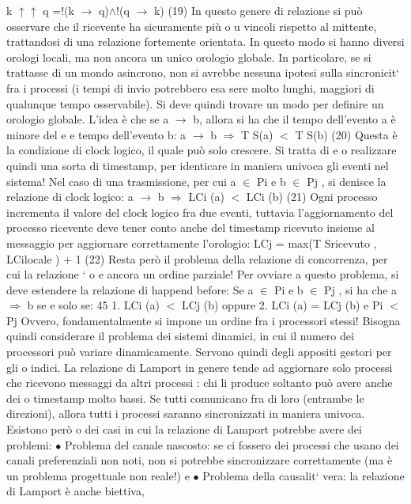 \documentclass[a4paper,12pt]{article}
\begin{document}
k $\uparrow$$\uparrow$ q =!(k $\rightarrow$ q)$\land$!(q $\rightarrow$ k)
(19)
In questo genere di relazione si può osservare che il ricevente ha sicuramente più
o
u
vincoli rispetto al mittente, trattandosi di una relazione fortemente orientata.
In questo modo si hanno diversi orologi locali, ma non ancora un unico orologio globale. In particolare, se si trattasse
di un mondo asincrono, non si avrebbe
nessuna ipotesi sulla sincronicit` fra i processi (i tempi di invio potrebbero esa
sere molto lunghi, maggiori di qualunque tempo osservabile). Si deve quindi
trovare un modo per definire un orologio globale.
L'idea è che se a $\rightarrow$ b, allora si ha che il tempo dell'evento a è minore del
e
e
tempo dell'evento b:
a $\rightarrow$ b $\Rightarrow$ T S(a) $<$ T S(b)
(20)
Questa è la condizione di clock logico, il quale può solo crescere. Si tratta di
e
o
realizzare quindi una sorta di timestamp, per identicare in maniera univoca gli
eventi nel sistema!
Nel caso di una trasmissione, per cui a $\in$ Pi e b $\in$ Pj , si denisce la relazione
di clock logico:
a $\rightarrow$ b $\Rightarrow$ LCi (a) $<$ LCi (b)
(21)
Ogni processo incrementa il valore del clock logico fra due eventi, tuttavia
l'aggiornamento del processo ricevente deve tener conto anche del timestamp
ricevuto insieme al messaggio per aggiornare correttamente l'orologio:
LCj = max(T Sricevuto , LCilocale ) + 1
(22)
Resta però il problema della relazione di concorrenza, per cui la relazione `
o
e
ancora un ordine parziale! Per ovviare a questo problema, si deve estendere la
relazione di happend before:
Se a $\in$ Pi e b $\in$ Pj , si ha che a $\Rightarrow$ b se e solo se:
45
1. LCi (a) $<$ LCj (b) oppure
2. LCi (a) = LCj (b) e Pi $<$ Pj
Ovvero, fondamentalmente si impone un ordine fra i processori stessi! Bisogna
quindi considerare il problema dei sistemi dinamici, in cui il numero dei processori può variare dinamicamente. Servono
quindi degli appositi gestori per gli
o
indici.
La relazione di Lamport in genere tende ad aggiornare solo processi che
ricevono messaggi da altri processi : chi li produce soltanto può avere anche dei
o
timestamp molto bassi. Se tutti comunicano fra di loro (entrambe le direzioni),
allora tutti i processi saranno sincronizzati in maniera univoca. Esistono però
o
dei casi in cui la relazione di Lamport potrebbe avere dei problemi:
$\bullet$ Problema del canale nascosto: se ci fossero dei processi che usano dei
canali preferenziali non noti, non si potrebbe sincronizzare correttamente
(ma è un problema progettuale non reale!)
e
$\bullet$ Problema della causalit` vera: la relazione di Lamport è anche biettiva,
$$
\end{document}
